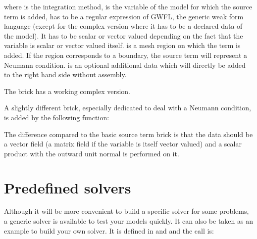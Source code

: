 \documentclass[a4paper,11pt,english]{sphinxmanual}
\begin{document}
where  is the integration method,  is
the variable of the model for which the source term is added,  has to be  a regular expression of GWFL, the generic weak form language (except for the complex version where it has to be a declared data of the model). It has to be
scalar or vector valued depending on the fact that the variable is scalar or
vector valued itself.  is a mesh region on which the term is added. If
the region corresponds to a boundary, the source term will represent a Neumann
condition.  is an optional additional data which will directly
be added to the right hand side without assembly.

The brick has a working complex version.

A slightly different brick, especially dedicated to deal with a Neumann condition,
is added by the following function:

\begin{sphinxVerbatim}[commandchars=\\\{\}]
 
                               
\end{sphinxVerbatim}

The difference compared to the basic source term brick is that the data should be
a vector field (a matrix field if the variable  is itself vector
valued) and a scalar product with the outward unit normal is performed on it.

\ignorespaces 

\section{Predefined solvers}
\label{\detokenize{userdoc/model_solvers:predefined-solvers}}\label{\detokenize{userdoc/model_solvers:ud-model-solvers}}\label{\detokenize{userdoc/model_solvers:index-0}}\label{\detokenize{userdoc/model_solvers::doc}}
Although it will be more convenient to build a specific
solver for some problems, a generic solver is available to test your models quickly. It
can also be taken as an example to build your own solver. It is defined in
 and  and the call is:
\end{document}
